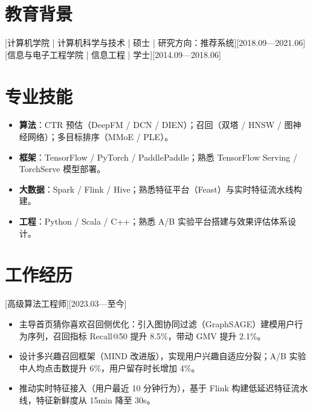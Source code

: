 \documentclass{resume-photo}
\begin{document}

\ResumeTitle


\section{教育背景}
[\textnormal{计算机学院 | 计算机科学与技术 | 硕士 | 研究方向：推荐系统}][2018.09—2021.06]
[\textnormal{信息与电子工程学院 | 信息工程 | 学士}][2014.09—2018.06]

\section{专业技能}
\begin{itemize}
  \item \textbf{算法}：CTR 预估（DeepFM / DCN / DIEN）；召回（双塔 / HNSW / 图神经网络）；多目标排序（MMoE / PLE）。
  \item \textbf{框架}：TensorFlow / PyTorch / PaddlePaddle；熟悉 TensorFlow Serving / TorchServe 模型部署。
  \item \textbf{大数据}：Spark / Flink / Hive；熟悉特征平台（Feast）与实时特征流水线构建。
  \item \textbf{工程}：Python / Scala / C++；熟悉 A/B 实验平台搭建与效果评估体系设计。
\end{itemize}

\section{工作经历}

[\textnormal{高级算法工程师}][2023.03—至今]
\begin{itemize}
  \item 主导首页猜你喜欢召回侧优化：引入图协同过滤（GraphSAGE）建模用户行为序列，召回指标 Recall@50 提升 8.5\%，带动 GMV 提升 2.1\%。
  \item 设计多兴趣召回框架（MIND 改进版），实现用户兴趣自适应分裂；A/B 实验中人均点击数提升 6\%，用户留存时长增加 4\%。
  \item 推动实时特征接入（用户最近 10 分钟行为），基于 Flink 构建低延迟特征流水线，特征新鲜度从 15min 降至 30s。
\end{itemize}
\end{document}

